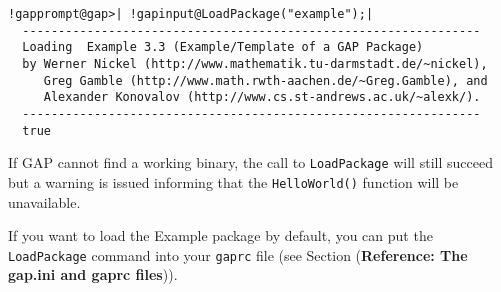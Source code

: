 \documentclass[a4paper,11pt]{report}
\begin{document}
{{ 
\begin{Verbatim}[commandchars=!@|,fontsize=\small,frame=single,label=Example]
  !gapprompt@gap>| !gapinput@LoadPackage("example");|
  ----------------------------------------------------------------
  Loading  Example 3.3 (Example/Template of a GAP Package)
  by Werner Nickel (http://www.mathematik.tu-darmstadt.de/~nickel),
     Greg Gamble (http://www.math.rwth-aachen.de/~Greg.Gamble), and
     Alexander Konovalov (http://www.cs.st-andrews.ac.uk/~alexk/).
  ----------------------------------------------------------------
  true
\end{Verbatim}
 

 If \textsf{GAP} cannot find a working binary, the call to \texttt{LoadPackage} will still succeed but a warning is issued informing that the \texttt{HelloWorld()} function will be unavailable. 

 If you want to load the \textsf{Example} package by default, you can put the \texttt{LoadPackage} command into your \texttt{gaprc} file (see Section{\nobreakspace} (\textbf{Reference: The gap.ini and gaprc files})). }

 }

    

\appendix
\end{document}

